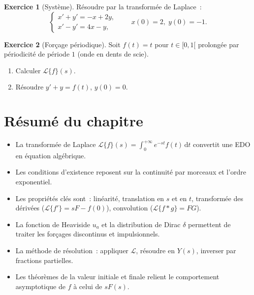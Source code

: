 \documentclass[12pt,a4paper,openany]{book}
\theoremstyle{definition}
\newtheorem{exercice}{Exercice}[chapter]
\theoremstyle{plain}
\theoremstyle{remark}
\newcommand{\dd}{\mathrm{d}}
\begin{document}
\begin{exercice}[Système]\label{exo:laplace-syst}
  Résoudre par la transformée de Laplace~:
  \[
    \begin{cases}
      x'+y'=-x+2y, \\
      x'-y'=4x-y,
    \end{cases}
    \qquad x(0)=2,\; y(0)=-1.
  \]
\end{exercice}

\begin{exercice}[Forçage périodique]\label{exo:laplace-period}
  Soit $f(t)=t$ pour $t\in[0,1[$ prolongée par périodicité de
  période $1$ (onde en dents de scie).
  \begin{enumerate}[label=\alph*)]
    \item Calculer $\mathcal{L}\{f\}(s)$.
    \item Résoudre $y'+y=f(t)$, $y(0)=0$.
  \end{enumerate}
\end{exercice}

\section*{Résumé du chapitre}

\begin{itemize}
  \item La transformée de Laplace $\mathcal{L}\{f\}(s)=\int_0^{+\infty}
    e^{-st}f(t)\,\dd t$ convertit une EDO en équation algébrique.
  \item Les conditions d'existence reposent sur la continuité par
    morceaux et l'ordre exponentiel.
  \item Les propriétés clés sont~: linéarité, translation en $s$ et
    en $t$, transformée des dérivées ($\mathcal{L}\{f'\}=sF-f(0)$),
    convolution ($\mathcal{L}\{f*g\}=FG$).
  \item La fonction de Heaviside $u_a$ et la distribution de Dirac
    $\delta$ permettent de traiter les forçages discontinus et
    impulsionnels.
  \item La méthode de résolution~: appliquer $\mathcal{L}$, résoudre
    en $Y(s)$, inverser par fractions partielles.
  \item Les théorèmes de la valeur initiale et finale relient le
    comportement asymptotique de $f$ à celui de $sF(s)$.
\end{itemize}
\end{document}
